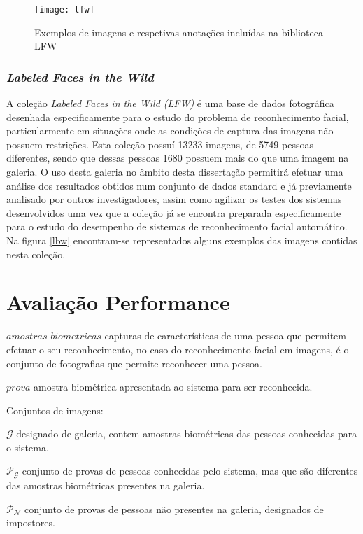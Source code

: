 \begin{figure}[t]
  \begin{center}
    \leavevmode
    \texttt{[image: lfw]}
    \caption{Exemplos de imagens e respetivas anotações incluídas na biblioteca LFW}	
    \label{fig:lfwimagem}
  \end{center}
\end{figure}

\subsubsection{\textit{Labeled Faces in the Wild}}
A coleção \textit{Labeled Faces in the Wild (LFW)} é uma base de dados fotográfica desenhada especificamente para o estudo do problema de reconhecimento facial, particularmente em situações onde as condições de captura das imagens não possuem restrições. Esta coleção possuí 13233 imagens, de 5749 pessoas diferentes, sendo que dessas pessoas 1680 possuem mais do que uma imagem na galeria. O uso desta galeria no âmbito desta dissertação permitirá efetuar uma análise dos resultados obtidos num conjunto de dados standard e já previamente analisado por outros investigadores, assim como agilizar os testes dos sistemas desenvolvidos uma vez que a coleção já se encontra preparada especificamente para o estudo do desempenho de sistemas de reconhecimento facial automático. Na figura \ref{lbw} encontram-se representados alguns exemplos das imagens contidas nesta coleção.

\section{Avaliação Performance}

$amostras$ $biometricas$ capturas de características de uma pessoa que permitem efetuar o seu reconhecimento, no caso do reconhecimento facial em imagens, é o conjunto de fotografias que permite reconhecer uma pessoa.

$prova$ amostra biométrica apresentada ao sistema para ser reconhecida.

Conjuntos de imagens:

$\mathscr{G}$ designado de galeria, contem amostras biométricas das pessoas conhecidas para o sistema.

$\mathscr{P}_\mathscr{G}$ conjunto de provas de pessoas conhecidas pelo sistema, mas que são diferentes das amostras biométricas presentes na galeria.

$\mathscr{P}_\mathscr{N}$ conjunto de provas de pessoas não presentes na galeria, designados de impostores.

